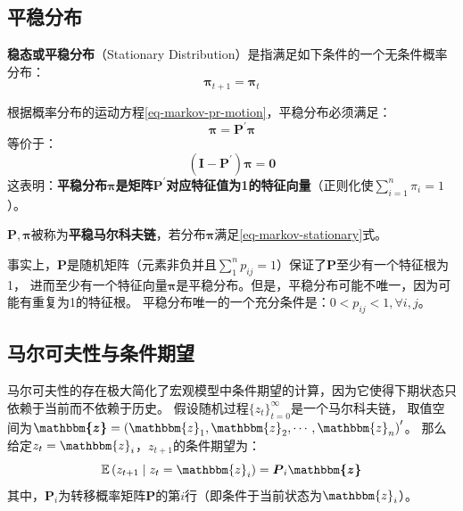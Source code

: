\subsection{平稳分布}

\begin{definition}
    \textbf{稳态或平稳分布}（Stationary Distribution）是指满足如下条件的一个无条件概率分布：
    \begin{equation*}
        \boldsymbol{\pi}_{t+1} = \boldsymbol{\pi}_t
    \end{equation*}
\end{definition}
根据概率分布的运动方程\ref{eq-markov-pr-motion}，平稳分布必须满足：
\begin{equation}    \label{eq-markov-stationary}
    \boldsymbol{\pi} = \boldsymbol{P}^{\prime}\boldsymbol{\pi}
\end{equation}
等价于：
\begin{equation}
    \left(\boldsymbol{I}-\boldsymbol{P}^{\prime}\right)\boldsymbol{\pi} = \boldsymbol{0}
\end{equation}
这表明：\textbf{平稳分布$\boldsymbol{\pi}$是矩阵$\boldsymbol{P}^{\prime}$对应特征值为1的特征向量}（正则化使$\sum_{i=1}^{n}\pi_i=1$）。

\begin{definition}
    $\boldsymbol{P}, \boldsymbol{\pi}$被称为\textbf{平稳马尔科夫链}，若分布$\boldsymbol{\pi}$满足\ref{eq-markov-stationary}式。
\end{definition}

事实上，$\boldsymbol{P}$是随机矩阵（元素非负并且$\sum_{1}^{n}p_{ij}=1$）保证了$\boldsymbol{P}$至少有一个特征根为1，
进而至少有一个特征向量$\boldsymbol{\pi}$是平稳分布。但是，平稳分布可能不唯一，因为可能有重复为1的特征根。
平稳分布唯一的一个充分条件是：$0<p_{i j}<1, \forall i, j$。


\subsection{马尔可夫性与条件期望}

马尔可夫性的存在极大简化了宏观模型中条件期望的计算，因为它使得下期状态只依赖于当前而不依赖于历史。
假设随机过程$\{z_t\}_{t=0}^{\infty}$是一个马尔科夫链，
取值空间为$\boldsymbol{\mathbbm{z}}=\left(\mathbbm{z}_1,\mathbbm{z}_2,\cdots,\mathbbm{z}_n\right)^{\prime}$。
那么给定$z_t=\mathbbm{z}_i$，$z_{t+1}$的条件期望为：
\begin{equation}
    \mathbb{E}\left(z_{t+1} \mid z_t=\mathbbm{z}_i\right) = \boldsymbol{P}_i\boldsymbol{\mathbbm{z}}
\end{equation}
其中，$\boldsymbol{P}_i$为转移概率矩阵$\boldsymbol{P}$的第$i$行（即条件于当前状态为$\mathbbm{z}_i$）。

